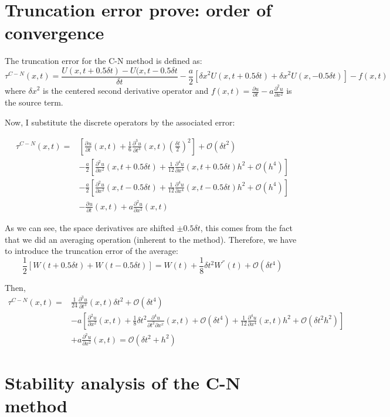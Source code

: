 \documentclass[10pt]{article}
\def\dt{\delta t}
\def\dxs{{\delta x}^2}
\def\heq{\frac{\partial u}{\partial t} -a\frac{\partial^2 u}{\partial x^2}}
\def\du#1#2{\frac{\partial^{#2} u}{\partial {#1}^{#2}}}
\begin{document}
\section{Truncation error prove: order of convergence}

The truncation error for the C-N method is defined as:
\[
  \tau^{C-N} (x,t)= \frac{U(x,t+0.5\dt)-U(x,t-0.5\dt}{\dt} -\frac{a}{2}\left[\dxs U(x,t+0.5\dt)+\dxs U(x,-0.5\dt)\right] -f(x,t)
\]
where $\dxs$ is the centered second derivative operator and $f(x,t)=\heq $ is the source term.

Now, I substitute the discrete operators by the associated error:


\begin{equation}
  \begin{split}
  \tau^{C-N} (x,t)=& \left[\du{t}{}(x,t)+\frac{1}{6}\du{t}{3}(x,t)\left(\frac{\dt}{2}\right)^2\right] +\mathcal{O}({\dt}^2)  \\
                   &-\frac{a}{2} \left[\du{x}{2}(x,t+0.5\dt)+\frac{1}{12}\du{x}{4}(x,t+0.5\dt)h^2 +\mathcal{O}({h}^4)\right]  \\
                   &-\frac{a}{2} \left[\du{x}{2}(x,t-0.5\dt)+\frac{1}{12}\du{x}{4}(x,t-0.5\dt)h^2 +\mathcal{O}({h}^4)\right] \\
                   & -\du{t}{}(x,t)+a\du{x}{2}(x,t)
  \end{split}
\end{equation}

As we can see, the space derivatives are shifted $\pm 0.5\dt$, this comes from the fact that we did an averaging operation (inherent 
to the method). Therefore, we have to introduce the truncation error of the average:
\[
\frac{1}{2}\left[ W(t+0.5\dt)+W(t-0.5\dt)\right]=W(t) +\frac{1}{8}\dt^2W^{''}(t) + \mathcal{O}(\dt^4)
\]

Then,
\begin{equation}
  \begin{split}
  \tau^{C-N} (x,t)= &\frac{1}{24} \du{t}{3}(x,t)\dt^2 + \mathcal{O}(\dt^4) \\  
                    &-a \left[\du{x}{2}(x,t) +\frac{1}{8}\dt^2 \frac{\partial^4u}{\partial t^2\partial x^x}(x,t) +\mathcal{O}(\dt^4) +%
                      \frac{1}{12}\du{x}{4}(x,t)h^2 +\mathcal{O}(\dt^2h^2) \right] \\
                    & + a\du{x}{2}(x,t)  = \mathcal{O}(\dt^2+h^2) 
  \end{split}
\end{equation}

\section{Stability analysis of the C-N method}
\end{document}
